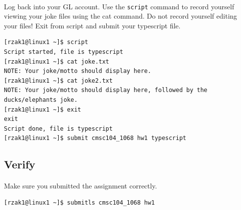 \documentclass[letter,11pt]{article}
\begin{document}
\paragraph{}Log back into your GL account. Use the \texttt{script} command to record yourself viewing your joke files using the cat command. Do not record yourself editing your files! Exit from script and submit your typescript file.
\begin{verbatim}
[rzak1@linux1 ~]$ script
Script started, file is typescript
[rzak1@linux1 ~]$ cat joke.txt
NOTE: Your joke/motto should display here.
[rzak1@linux1 ~]$ cat joke2.txt
NOTE: Your joke/motto should display here, followed by the ducks/elephants joke.
[rzak1@linux1 ~]$ exit
exit
Script done, file is typescript
[rzak1@linux1 ~]$ submit cmsc104_1068 hw1 typescript
\end{verbatim}

\newpage
\subsection*{Verify}
\paragraph{}Make sure you submitted the assignment correctly.
\begin{verbatim}
[rzak1@linux1 ~]$ submitls cmsc104_1068 hw1
\end{verbatim}
\end{document}
